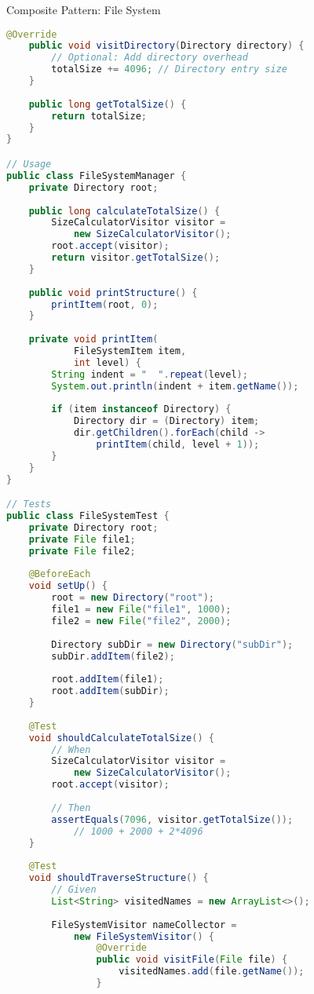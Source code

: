 \begin{example2}{Composite Pattern: File System}
\begin{lstlisting}[language=Java, style=basesmol]
    @Override
    public void visitDirectory(Directory directory) {
        // Optional: Add directory overhead
        totalSize += 4096; // Directory entry size
    }
    
    public long getTotalSize() {
        return totalSize;
    }
}

// Usage
public class FileSystemManager {
    private Directory root;
    
    public long calculateTotalSize() {
        SizeCalculatorVisitor visitor = 
            new SizeCalculatorVisitor();
        root.accept(visitor);
        return visitor.getTotalSize();
    }
    
    public void printStructure() {
        printItem(root, 0);
    }
    
    private void printItem(
            FileSystemItem item, 
            int level) {
        String indent = "  ".repeat(level);
        System.out.println(indent + item.getName());
        
        if (item instanceof Directory) {
            Directory dir = (Directory) item;
            dir.getChildren().forEach(child -> 
                printItem(child, level + 1));
        }
    }
}

// Tests
public class FileSystemTest {
    private Directory root;
    private File file1;
    private File file2;
    
    @BeforeEach
    void setUp() {
        root = new Directory("root");
        file1 = new File("file1", 1000);
        file2 = new File("file2", 2000);
        
        Directory subDir = new Directory("subDir");
        subDir.addItem(file2);
        
        root.addItem(file1);
        root.addItem(subDir);
    }
    
    @Test
    void shouldCalculateTotalSize() {
        // When
        SizeCalculatorVisitor visitor = 
            new SizeCalculatorVisitor();
        root.accept(visitor);
        
        // Then
        assertEquals(7096, visitor.getTotalSize()); 
            // 1000 + 2000 + 2*4096
    }
    
    @Test
    void shouldTraverseStructure() {
        // Given
        List<String> visitedNames = new ArrayList<>();
        
        FileSystemVisitor nameCollector = 
            new FileSystemVisitor() {
                @Override
                public void visitFile(File file) {
                    visitedNames.add(file.getName());
                }
                

\end{lstlisting}
\end{example2}
